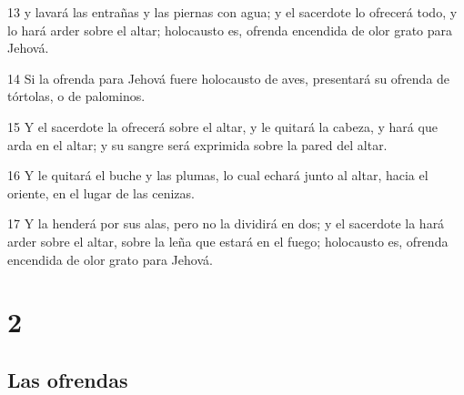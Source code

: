 \par 13 y lavará las entrañas y las piernas con agua; y el sacerdote lo ofrecerá todo, y lo hará arder sobre el altar; holocausto es, ofrenda encendida de olor grato para Jehová.
\par 14 Si la ofrenda para Jehová fuere holocausto de aves, presentará su ofrenda de tórtolas, o de palominos.
\par 15 Y el sacerdote la ofrecerá sobre el altar, y le quitará la cabeza, y hará que arda en el altar; y su sangre será exprimida sobre la pared del altar.
\par 16 Y le quitará el buche y las plumas, lo cual echará junto al altar, hacia el oriente, en el lugar de las cenizas.
\par 17 Y la henderá por sus alas, pero no la dividirá en dos; y el sacerdote la hará arder sobre el altar, sobre la leña que estará en el fuego; holocausto es, ofrenda encendida de olor grato para Jehová.

\chapter{2}

\section*{Las ofrendas}

